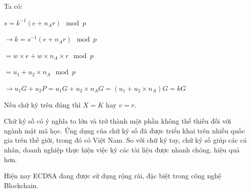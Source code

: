 Ta có:

$s = k^{-1}(e+ n_A r)\mod p$

$\to k = s^{-1}(e+ n_A r)\mod p$

$= w \times e + w \times n_A \times r \mod p$

$=u_1 + u_2 \times n_A \mod p$

$\to u_1G + u_2P = u_1G + u_2 \times n_A G = (u_1+u_2 \times n_A)G = kG$

Nếu chữ ký trên đúng thì $X=K$ hay $v=r$.



Chữ ký số có ý nghĩa to lớn và trở thành một phần không thể thiếu đối
với ngành mật mã học. Ứng dụng của chữ ký số đã được triển khai trên 
nhiều quốc gia trên thế giới, trong đó có Việt Nam. So với chữ ký tay, 
chữ ký số giúp các cá nhân, doanh nghiệp thực hiện việc ký các tài 
liệu được nhanh chóng, hiệu quả hơn. 

Hiện nay ECDSA đang được sử dụng rộng rãi, đặc biệt trong công nghệ Blockchain.
